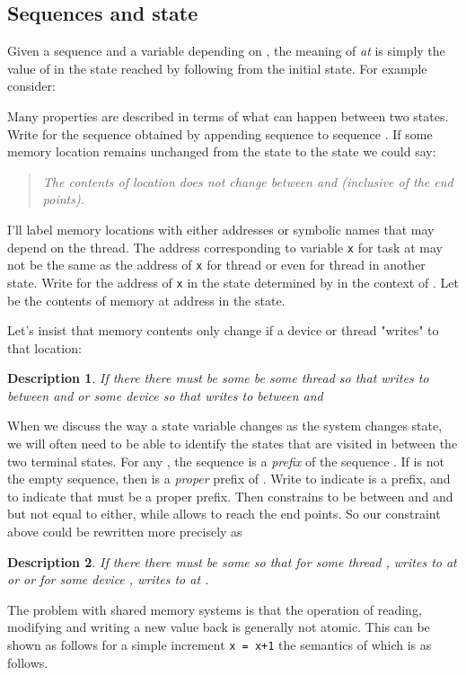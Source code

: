 \documentclass[english,11pt]{article}
\newtheorem{expl}{Description}[section]
\begin{document}
\subsection{Sequences and state}
Given a sequence  and a variable depending on ,  the meaning of 
\emph{ at } is simply the value of  in the state reached by following
 from the initial state. For example consider:


Many properties are described in terms of what
can happen between two states. Write  for the sequence obtained by appending
sequence  to sequence . 
If some memory location  remains
unchanged from the  state to the  state we could say:
\begin{quote}{\em
The contents of location  does not change between  and  (inclusive of the end points).
}\end{quote}
I'll label memory locations with either addresses or symbolic names that
may depend on the thread. The address corresponding to variable {\tt x} for
task  at  may not be the same as the address of {\tt x} for thread 
or even for thread  in another state. Write  for the
address of {\tt x} in the state determined by  in the context of .
Let  be the contents of memory at address  in the  state. 

Let's insist that memory contents only change if a device or thread "writes" to
that location:
\begin{expl}
If  there there must be some 
be some thread  so that  writes  to  between  and 
or some device  so that  writes  to  between  and 
\end{expl}

When we discuss the way a state variable changes as the system changes state,
we will often need to be able to identify the states that are visited 
in between the two terminal states. For any , the
sequence  is a {\em prefix} of the sequence . If  is not the empty
sequence, then  is a {\em proper} prefix of . Write  to 
indicate  is a prefix, and  to indicate that  must be a proper
prefix. Then  constrains  to be between  and  and but
not equal to either, while  allows  to reach the end points. So our constraint above could be rewritten more precisely as

\begin{expl}
If  there there must be some 
 so that 
for some thread ,  writes  to  at  or 
or for some device ,  writes  to  at .
\end{expl}

The problem with shared memory systems is that the operation of reading,
modifying and writing a new value back is generally not atomic. This 
can be shown as follows for a simple increment {\tt x = x+1} the
semantics of which is as follows.
\end{document}
